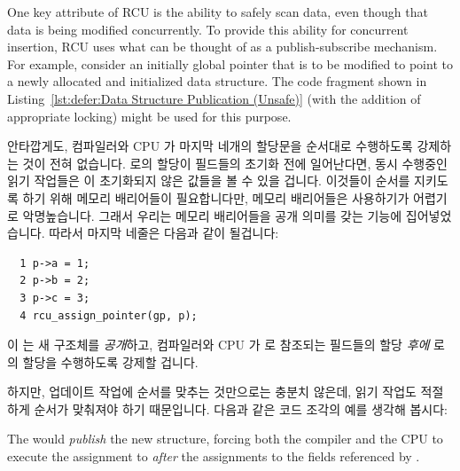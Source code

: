 One key attribute of RCU is the ability to safely scan data, even
though that data is being modified concurrently.
To provide this ability for concurrent insertion,
RCU uses what can be thought of as a publish-subscribe mechanism.
For example, consider an initially  global pointer
 that is to be modified to point to a newly allocated
and initialized data structure.
The code fragment shown in
Listing~\ref{lst:defer:Data Structure Publication (Unsafe)}
(with the addition of appropriate locking)
might be used for this purpose.
\fi

안타깝게도, 컴파일러와 CPU 가 마지막 네개의 할당문을 순서대로 수행하도록
강제하는 것이 전혀 없습니다.
 로의 할당이  필드들의 초기화 전에 일어난다면, 동시 수행중인 읽기
작업들은 이 초기화되지 않은 값들을 볼 수 있을 겁니다.
이것들이 순서를 지키도록 하기 위해 메모리 배리어들이 필요합니다만, 메모리
배리어들은 사용하기가 어렵기로 악명높습니다.
그래서 우리는 메모리 배리어들을 공개 의미를 갖는 
기능에 집어넣었습니다.
따라서 마지막 네줄은 다음과 같이 될겁니다:

\vspace{5pt}
\begin{minipage}[t]{\columnwidth}
\scriptsize
\begin{verbatim}
  1 p->a = 1;
  2 p->b = 2;
  3 p->c = 3;
  4 rcu_assign_pointer(gp, p);
\end{verbatim}
\end{minipage}
\vspace{5pt}

이  는 새 구조체를 \emph{공개}하고, 컴파일러와 CPU 가
 로 참조되는 필드들의 할당 \emph{후에}  로의 할당을 수행하도록
강제할 겁니다.

하지만, 업데이트 작업에 순서를 맞추는 것만으로는 충분치 않은데, 읽기 작업도
적절하게 순서가 맞춰져야 하기 때문입니다.
다음과 같은 코드 조각의 예를 생각해 봅시다:
\iffalse

The 
would \emph{publish} the new structure, forcing both the compiler
and the CPU to execute the assignment to  \emph{after}
the assignments to the fields referenced by .

